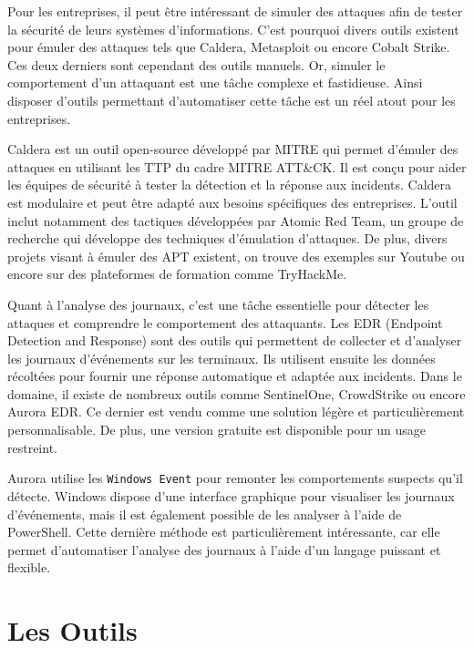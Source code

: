 \documentclass[12pt,letterpaper]{article}
\begin{document}
\bigskip

Pour les entreprises, il peut être intéressant de simuler des attaques afin de tester la sécurité de leurs systèmes d'informations.
C'est pourquoi divers outils existent pour émuler des attaques tels que Caldera, Metasploit ou encore Cobalt Strike.
Ces deux derniers sont cependant des outils manuels. Or, simuler le comportement d'un attaquant est une tâche complexe et fastidieuse.
Ainsi disposer d'outils permettant d'automatiser cette tâche est un réel atout pour les entreprises.

\bigskip

Caldera est un outil open-source développé par MITRE qui permet d'émuler des attaques en utilisant les TTP du cadre MITRE ATT\&CK.
Il est conçu pour aider les équipes de sécurité à tester la détection et la réponse aux incidents.
Caldera est modulaire et peut être adapté aux besoins spécifiques des entreprises.
L'outil inclut notamment des tactiques développées par Atomic Red Team, un groupe de recherche qui développe des techniques d'émulation d'attaques.
De plus, divers projets visant à émuler des APT existent, on trouve des exemples sur Youtube ou encore sur des plateformes de formation comme TryHackMe.

\bigskip

Quant à l'analyse des journaux, c'est une tâche essentielle pour détecter les attaques et comprendre le comportement des attaquants.
Les EDR (Endpoint Detection and Response) sont des outils qui permettent de collecter et d'analyser les journaux d'événements sur les terminaux.
Ils utilisent ensuite les données récoltées pour fournir une réponse automatique et adaptée aux incidents.
Dans le domaine, il existe de nombreux outils comme SentinelOne, CrowdStrike ou encore Aurora EDR.
Ce dernier est vendu comme une solution légère et particulièrement personnalisable.
De plus, une version gratuite est disponible pour un usage restreint.

\bigskip

Aurora utilise les \verb|Windows Event| pour remonter les comportements suspects qu'il détecte.
Windows dispose d'une interface graphique pour visualiser les journaux d'événements, mais il est également possible de les analyser à l'aide de PowerShell.
Cette dernière méthode est particulièrement intéressante, car elle permet d'automatiser l'analyse des journaux à l'aide d'un langage puissant et flexible.

\newpage
\section{Les Outils}
\end{document}
